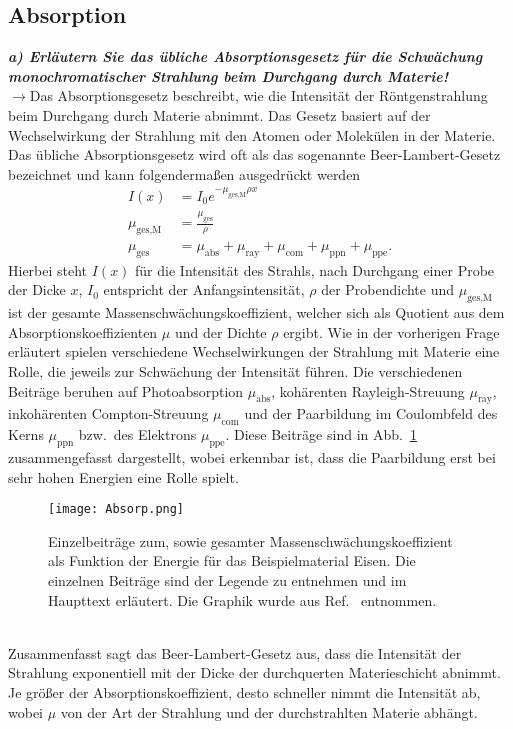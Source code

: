 \subsection{\label{subsec:FZV3}Absorption}
\textbf{\textit{a) Erläutern Sie das übliche Absorptionsgesetz für die Schwächung monochromatischer
Strahlung beim Durchgang durch Materie!}}\\
$\rightarrow$Das Absorptionsgesetz beschreibt, wie die Intensität der Röntgenstrahlung 
beim Durchgang durch Materie abnimmt. Das Gesetz basiert auf der Wechselwirkung der Strahlung mit den Atomen 
oder Molekülen in der Materie. Das übliche Absorptionsgesetz wird oft als das sogenannte Beer-Lambert-Gesetz
bezeichnet und kann folgendermaßen ausgedrückt werden \cite{Kristall}
\begin{align}
    I(x) &= I_{0}e^{-\mu_{\text{ges,M}}\rho x} \\
    \mu_{\text{ges,M}} &= \frac{\mu_{\text{ges}}}{\rho} \\
    \mu_{\text{ges}} &= \mu_{\text{abs}} + \mu_{\text{ray}} + \mu_{\text{com}} + \mu_{\text{ppn}} + \mu_{\text{ppe}}.
\end{align}
Hierbei steht $I(x)$ für die Intensität des Strahls, nach Durchgang einer Probe der Dicke $x$, $I_{0}$ entspricht der
Anfangsintensität, $\rho$ der Probendichte und $\mu_{\text{ges,M}}$ ist der gesamte Massenschwächungskoeffizient, 
welcher sich als Quotient aus dem Absorptionskoeffizienten $\mu$ und der Dichte $\rho$ ergibt. 
Wie in der vorherigen Frage erläutert spielen verschiedene Wechselwirkungen der Strahlung mit Materie eine Rolle, die 
jeweils zur Schwächung der Intensität führen. Die verschiedenen Beiträge beruhen auf Photoabsorption $\mu_{\text{abs}}$, 
kohärenten Rayleigh-Streuung $\mu_{\text{ray}}$, inkohärenten Compton-Streuung $\mu_{\text{com}}$ und der 
Paarbildung im Coulombfeld des Kerns $\mu_{\text{ppn}}$ bzw.~des Elektrons $\mu_{\text{ppe}}$.
Diese Beiträge sind in Abb.~\ref{fig:absorp} zusammengefasst dargestellt, wobei erkennbar ist, dass 
die Paarbildung erst bei sehr hohen Energien eine Rolle spielt.
\begin{figure}[h!]
    \centering
    \texttt{[image: Absorp.png]}
    \caption{\label{fig:absorp}Einzelbeiträge zum, sowie gesamter Massenschwächungskoeffizient
    als Funktion der Energie für das Beispielmaterial Eisen. Die einzelnen Beiträge sind der Legende zu 
    entnehmen und im Haupttext erläutert. Die Graphik wurde aus Ref.~\cite{Absorp} entnommen.}
\end{figure} \FloatBarrier \,\\
Zusammenfasst sagt das Beer-Lambert-Gesetz aus, dass die Intensität der Strahlung exponentiell mit der Dicke der 
durchquerten Materieschicht abnimmt. Je größer der Absorptionskoeffizient, desto schneller nimmt die Intensität ab, 
wobei $\mu$ von der Art der Strahlung und der durchstrahlten Materie abhängt. \\

